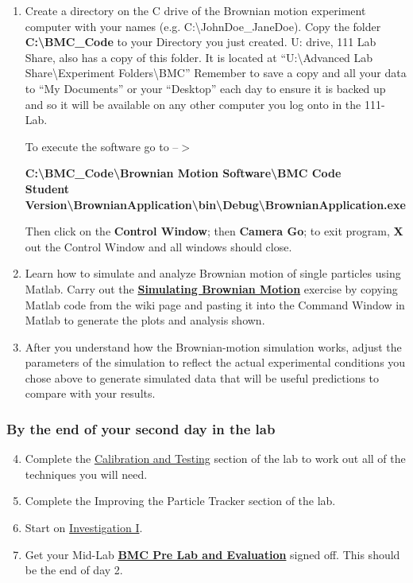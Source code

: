 \documentclass{../lab}
\begin{document}
\begin{enumerate}
    \item Create a directory on the C drive of the Brownian motion experiment computer with your names (e.g. C:\textbackslash  JohnDoe\_JaneDoe). Copy the folder \textbf{C:\textbackslash  BMC\_Code }to your Directory you just created.  U: drive, 111 Lab Share, also has a copy of this folder. It is located at ``U:\textbackslash  Advanced Lab Share\textbackslash  Experiment Folders\textbackslash  BMC'' Remember to save a copy and all your data to ``My Documents'' or your ``Desktop'' each day to ensure it is backed up and so it will be available on any other computer you log onto in the 111-Lab.

    To execute the software go to --$>$
    
    \textbf{C:\textbackslash  BMC\_Code\textbackslash  Brownian Motion Software\textbackslash  BMC Code \\
    Student Version\textbackslash  BrownianApplication\textbackslash  bin\textbackslash  Debug\textbackslash  BrownianApplication.exe}
    
    Then click on the \textbf{Control Window}; then \textbf{Camera Go}; to exit program, \textbf{X} out the Control Window and all windows should close.
    
    \item Learn how to simulate and analyze Brownian motion of single particles using Matlab. Carry out the \href{http://experimentationlab.berkeley.edu/node/83}{\textbf{Simulating Brownian Motion}} exercise by copying Matlab code from the wiki page and pasting it into the Command Window in Matlab to generate the plots and analysis shown.
    
    \item After you understand how the Brownian-motion simulation works, adjust the parameters of the simulation to reflect the actual experimental conditions you chose above to generate simulated data that will be useful predictions to compare with your results.
\end{enumerate}

\subsubsection{By the end of your second day in the lab}

\begin{enumerate}
    \setcounter{enumi}{3}
    \item Complete the \hyperref[sec:CalibrationAndTesting]{Calibration and Testing} section of the lab to work out all of the techniques you will need.

    \item Complete the Improving the Particle Tracker section of the lab.
    
    \item Start on  \hyperref[sec:InvestigationI]{Investigation I}.
    
    \item Get your Mid-Lab \href{http://experimentationlab.berkeley.edu/BMCPreLab}{\textbf{BMC Pre Lab and Evaluation}} signed off. This should be the end of day 2.
\end{enumerate}
\end{document}
